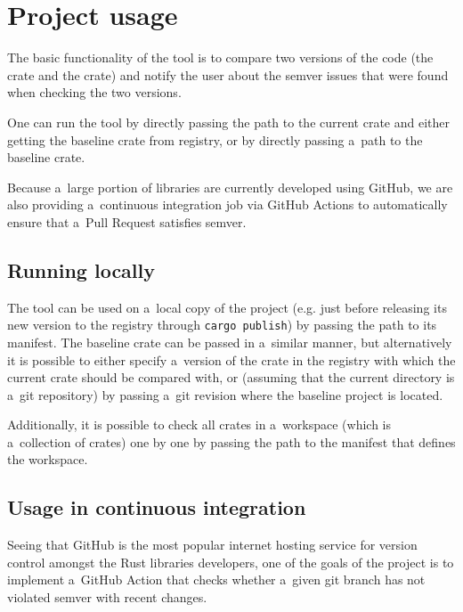 \documentclass[licencjacka,en]{pracamgr}
\begin{document}
\section{Project usage}\label{r:section_project_usage}

The basic functionality of the tool is to compare two versions of the code (the  crate
and the  crate) and notify the user about the semver issues that were found when
checking the two versions.

One can run the tool by directly passing the path to the current crate and either getting the
baseline crate from registry, or by directly passing a~path to the baseline crate.

Because a~large portion of libraries are currently developed using GitHub, we are also providing
a~continuous integration job via GitHub Actions to automatically ensure that a~Pull Request
satisfies semver.

\subsection{Running locally}\label{r:subsection_running_locally}

The tool can be used on a~local copy of the project (e.g. just before releasing its new
version to the registry through \texttt{cargo publish}) by passing the path to its manifest.
The baseline crate can be passed in a~similar manner, but alternatively it is possible to either
specify a~version of the crate in the registry with which the current crate should be compared
with, or (assuming that the current directory is a~git repository) by passing a~git revision where
the baseline project is located.

Additionally, it is possible to check all crates in a~workspace (which is a~collection of crates)
one by one by passing the path to the manifest that defines the workspace.

\subsection{Usage in continuous integration}\label{r:subsection_usage_in_ci}

Seeing that GitHub is the most popular internet hosting service for version control amongst the
Rust libraries developers, one of the goals of the project is to implement a~GitHub Action that
checks whether a~given git branch has not violated semver with recent changes.
\end{document}

